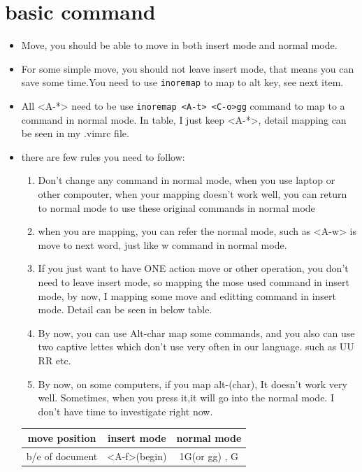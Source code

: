 \documentclass[a4paper,12pt,twoside]{book}
\begin{document}
\section{basic command}
	\begin{itemize}
	\item Move, you should be able to move in both insert mode and normal mode.
	\item For some simple move, you should not leave insert mode, that means you can save some time.You need to use \verb!inoremap! to map to alt key, see next item.

	\item All <A-*> need to be use \verb!inoremap <A-t> <C-o>gg! command to map to a command in normal mode. In table, I just keep <A-*>, detail mapping can be seen in my .vimrc file. 

	\item there are few rules you need to follow:
			\begin{enumerate}
					\item Don't change any command in normal mode, when you use laptop or other compouter, when your mapping doesn't work well, you can return to normal mode to use these original commands in normal mode
					\item when you are mapping, you can refer the normal mode, such as <A-w> is move to next word, just like w command in normal mode.
					\item If you just want to have ONE action move or other operation, you don't need to leave insert mode, so mapping the mose used command in insert mode, by now, I mapping some move and editting command in insert mode. Detail can be seen in below table.

					\item By now, you can use Alt-char map some commands, and you also can use two captive lettes which don't use very often in our language. such as UU RR etc. 
					\item By now, on some computers, if you map alt-(char), It doesn't work very well. Sometimes, when you press it,it will go into the normal mode. I don't have time to investigate right now. 
			\end{enumerate}


	\begin{center}
		\begin{tabular}{c|c|c}
		\hline 
        move position & insert mode & normal mode \\

		\hline
		b/e of document &  <A-f>(begin)  & 1G(or gg) , G  \\


\end{tabular}
\end{center}
\end{itemize}
\end{document}
